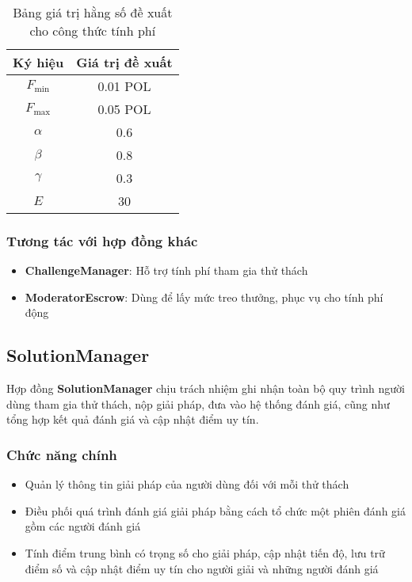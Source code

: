 \begin{table}[H]
  \centering
  \begin{tabular}{|c|c|}
    \hline
    \textbf{Ký hiệu} & \textbf{Giá trị đề xuất} \\
    \hline
    $F_{\text{min}}$ & 0.01 POL                 \\
    \hline
    $F_{\text{max}}$ & 0.05 POL                 \\
    \hline
    $\alpha$         & 0.6                      \\
    \hline
    $\beta$          & 0.8                      \\
    \hline
    $\gamma$         & 0.3                      \\
    \hline
    $E$              & 30                       \\
    \hline
  \end{tabular}
  \caption{Bảng giá trị hằng số đề xuất cho công thức tính phí}
  \label{tab:suggested-constant-values-for-compute-joining-fee}
\end{table}

\subsubsection{Tương tác với hợp đồng khác}

\begin{itemize}
  \item \textbf{ChallengeManager}: Hỗ trợ tính phí tham gia thử thách
  \item \textbf{ModeratorEscrow}: Dùng để lấy mức treo thưởng, phục vụ cho tính phí động
\end{itemize}

\subsection{SolutionManager}

Hợp đồng \textbf{SolutionManager} chịu trách nhiệm ghi nhận toàn bộ quy trình người dùng tham gia thử thách, nộp giải pháp, đưa vào hệ thống đánh giá, cũng như tổng hợp kết quả đánh giá và cập nhật điểm uy tín.

\subsubsection{Chức năng chính}

\begin{itemize}
  \item Quản lý thông tin giải pháp của người dùng đối với mỗi thử thách
  \item Điều phối quá trình đánh giá giải pháp bằng cách tổ chức một phiên đánh giá gồm các người đánh giá
  \item Tính điểm trung bình có trọng số cho giải pháp, cập nhật tiến độ, lưu trữ điểm số và cập nhật điểm uy tín cho người giải và những người đánh giá
\end{itemize}

